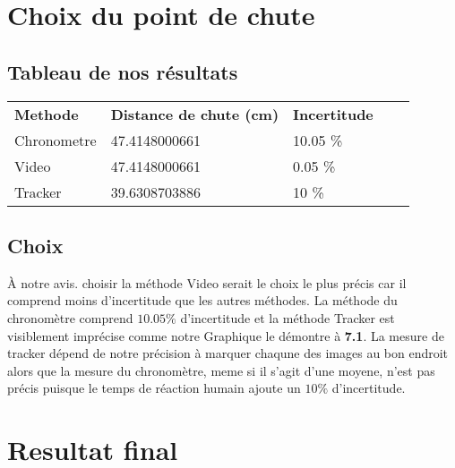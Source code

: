 \documentclass{article}
\begin{document}
        \section{Choix du point de chute}
            \vspace{10mm}
            \subsection{Tableau de nos résultats}
                 \begin{table}[H]
                \begin{tabular}{lllll}
                \textbf{Methode}     & \textbf{Distance de chute (cm)} & \textbf{Incertitude} &  &  \\
                Chronometre & 47.4148000661             & 10.05 \%    &  &  \\
                Video       & 47.4148000661             & 0.05 \%        &  &  \\
                Tracker     & 39.6308703886             & 10 \%       &  &
                \end{tabular}
                \end{table}
                \vspace{10mm}
            \subsection{Choix}
                \hspace{11mm} À notre avis. choisir la méthode Video serait le choix le plus précis car il comprend moins d'incertitude que les autres méthodes. La méthode du chronomètre comprend $10.05 \%$ d'incertitude et la méthode Tracker est visiblement imprécise comme notre Graphique le démontre à \textbf{7.1}. La mesure de tracker dépend de notre précision à marquer chaqune des images au bon endroit alors que la mesure du chronomètre, meme si il s'agit d'une moyene, n'est pas précis puisque le temps de réaction humain ajoute un $10 \%$ d'incertitude.
                \vspace{10mm}

        \section{Resultat final}
\end{document}
